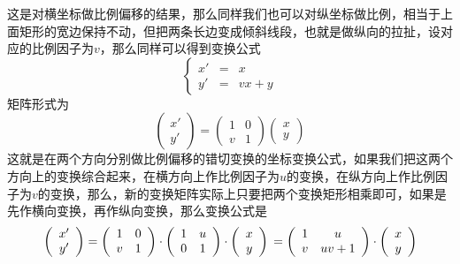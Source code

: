 这是对横坐标做比例偏移的结果，那么同样我们也可以对纵坐标做比例，相当于上面矩形的宽边保持不动，但把两条长边变成倾斜线段，也就是做纵向的拉扯，设对应的比例因子为$v$，那么同样可以得到变换公式
\begin{equation}
  \label{eq:scale-translation-coordinate-formula}
  \left\{
    \begin{array}{ccc}
      x' & = &  x \\
      y' & = &  vx+y
    \end{array}
  \right.
\end{equation}
矩阵形式为
\begin{equation*}
  \left(
    \begin{array}{c}
      x' \\
      y'
    \end{array}
  \right)
    =
    \left(
      \begin{array}{cc}
        1 & 0 \\
        v & 1
      \end{array}
    \right)
  \left(
    \begin{array}{c}
      x \\
      y
    \end{array}
  \right)
\end{equation*}
这就是在两个方向分别做比例偏移的错切变换的坐标变换公式，如果我们把这两个方向上的变换综合起来，在横方向上作比例因子为$u$的变换，在纵方向上作比例因子为$v$的变换，那么，新的变换矩阵实际上只要把两个变换矩形相乘即可，如果是先作横向变换，再作纵向变换，那么变换公式是
\begin{equation*}
  \left(
    \begin{array}{c}
      x' \\
      y'
    \end{array}
  \right)
    = 
    \left(
      \begin{array}{cc}
        1 & 0 \\
        v & 1
      \end{array}
    \right)
\cdot
    \left(
      \begin{array}{cc}
        1 & u \\
        0 & 1
      \end{array}
    \right)
 \cdot
  \left(
    \begin{array}{c}
      x \\
      y
    \end{array}
  \right)
  \\
   = 
     \left(
      \begin{array}{cc}
        1 & u \\
        v & uv+1
      \end{array}
    \right)
 \cdot
  \left(
    \begin{array}{c}
      x \\
      y
    \end{array}
  \right)
\end{equation*}
